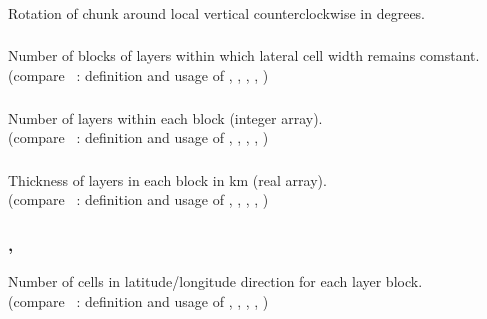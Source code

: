 \subsubsection{} 
Rotation of chunk around local vertical counterclockwise in degrees.
\subsubsection{}
Number of blocks of layers within which lateral cell width remains comstant.\\
(compare ~: definition and usage of , 
, , , )
\subsubsection{}
Number of layers within each block (integer array).\\
(compare ~: definition and usage of , 
, , , )
\subsubsection{}
Thickness of layers in each block in km (real array).\\
(compare ~: definition and usage of , 
, , , )
\subsubsection{, }
Number of cells in latitude/longitude direction for each layer block.\\
(compare ~: definition and usage of , 
, , , )
